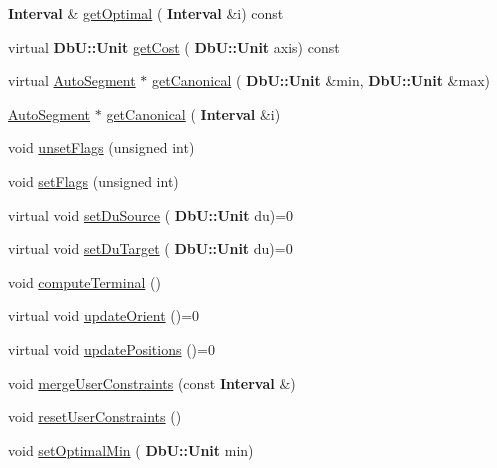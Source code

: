 \begin{DoxyCompactItemize}
\item 
\textbf{ Interval} \& \mbox{\hyperlink{classKatabatic_1_1AutoSegment_a110201bd7c64ed78522cfb3f7b142431}{get\+Optimal}} (\textbf{ Interval} \&i) const
\item 
virtual \textbf{ Db\+U\+::\+Unit} \mbox{\hyperlink{classKatabatic_1_1AutoSegment_a0e3a02c7a9c1bd559fda628d596b00cd}{get\+Cost}} (\textbf{ Db\+U\+::\+Unit} axis) const
\item 
virtual \mbox{\hyperlink{classKatabatic_1_1AutoSegment}{Auto\+Segment}} $\ast$ \mbox{\hyperlink{classKatabatic_1_1AutoSegment_a8acbe1037827da2c2fef71a18c5886c7}{get\+Canonical}} (\textbf{ Db\+U\+::\+Unit} \&min, \textbf{ Db\+U\+::\+Unit} \&max)
\item 
\mbox{\hyperlink{classKatabatic_1_1AutoSegment}{Auto\+Segment}} $\ast$ \mbox{\hyperlink{classKatabatic_1_1AutoSegment_a988beca5780421c168a2475a5298009a}{get\+Canonical}} (\textbf{ Interval} \&i)
\item 
void \mbox{\hyperlink{classKatabatic_1_1AutoSegment_a1a6fac115cb81db48e3ac9ffa0721bb5}{unset\+Flags}} (unsigned int)
\item 
void \mbox{\hyperlink{classKatabatic_1_1AutoSegment_aeb14f94914af58657a0dc2f50ec98df5}{set\+Flags}} (unsigned int)
\item 
virtual void \mbox{\hyperlink{classKatabatic_1_1AutoSegment_aaf60d18ab6d951a34a3d06959ce2e76f}{set\+Du\+Source}} (\textbf{ Db\+U\+::\+Unit} du)=0
\item 
virtual void \mbox{\hyperlink{classKatabatic_1_1AutoSegment_a246756d4c8b3e094a0a9d6de3c2109ff}{set\+Du\+Target}} (\textbf{ Db\+U\+::\+Unit} du)=0
\item 
void \mbox{\hyperlink{classKatabatic_1_1AutoSegment_abc72aaeefa7450eaf67aee3212ec974d}{compute\+Terminal}} ()
\item 
virtual void \mbox{\hyperlink{classKatabatic_1_1AutoSegment_a102e0f4bbb0386e41be214d15a9e4549}{update\+Orient}} ()=0
\item 
virtual void \mbox{\hyperlink{classKatabatic_1_1AutoSegment_a6d95f4de39c13611786c95ddc7b8942e}{update\+Positions}} ()=0
\item 
void \mbox{\hyperlink{classKatabatic_1_1AutoSegment_ae82ffef92ad9ffdc5da5e0c1830d9537}{merge\+User\+Constraints}} (const \textbf{ Interval} \&)
\item 
void \mbox{\hyperlink{classKatabatic_1_1AutoSegment_ac8768352909d37ebad1c06c9cf4ef8bb}{reset\+User\+Constraints}} ()
\item 
void \mbox{\hyperlink{classKatabatic_1_1AutoSegment_af92b3d000552b630695879dd5d4736a1}{set\+Optimal\+Min}} (\textbf{ Db\+U\+::\+Unit} min)

\end{DoxyCompactItemize}
